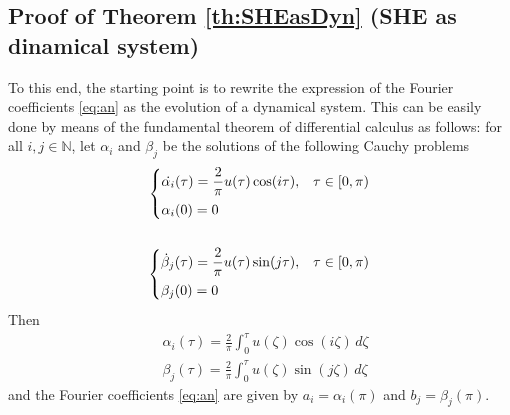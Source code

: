 
\subsection{Proof of Theorem \ref{th:SHEasDyn} (SHE as dinamical system)}\label{proof:SHEasDyn}


To this end, the starting point is to rewrite the expression of the Fourier coefficients \eqref{eq:an} as the evolution of a dynamical system. This can be easily done by means of the fundamental theorem of differential calculus as follows: for all $i,j\in\mathbb{N}$, let $\alpha_i$ and $\beta_j$ be the solutions of the following Cauchy problems
\begin{align}\label{eq:Cauchy}
	\begin{cases} 
		\displaystyle\dot{\alpha_i}(\tau)  = \frac{2}{\pi}u(\tau)\cos(i\tau), & \tau\in [0,\pi) 
		\\[6pt]  
		\alpha_i(0)  = 0       
	\end{cases} \notag 
	\\
	\\
	\begin{cases} 
		\displaystyle\dot{\beta}_j(\tau)  = \frac{2}{\pi}u(\tau)\sin(j\tau), & \tau\in [0,\pi) 
		\\[6pt]  
		\beta_j(0) = 0       
	\end{cases}\notag
\end{align}
Then 
\begin{align*}
	&\alpha_i(\tau)= \frac{2}{\pi}\int_0^\tau u(\zeta) \cos(i\zeta)\,d\zeta 
	\\[5pt]
	&\beta_j(\tau) = \frac{2}{\pi}\int_0^\tau u(\zeta) \sin(j\zeta)\,d\zeta 
\end{align*}
and the Fourier coefficients \eqref{eq:an} are given by $a_i=\alpha_i(\pi)$ and $b_j=\beta_j(\pi)$.  

